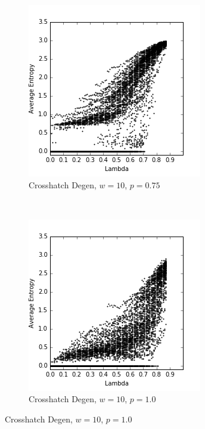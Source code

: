 \documentclass[a4paper,11pt]{report}
\begin{document}
\begin{figure}[htp]
\begin{subfigure}[t]{0.4\textwidth}
  \end{subfigure}

\begin{subfigure}[t]{0.4\textwidth}
  \centering
  \includegraphics[width=\textwidth]{ch6_figs/ch_w10_p75_entropy_scatter}
  \caption{Crosshatch Degen, $w=10$, $p=0.75$}
  \label{fig:lw_w10_p75}
  \end{subfigure}
~
\begin{subfigure}[t]{0.4\textwidth}
  \centering
  \includegraphics[width=\textwidth]{ch6_figs/ch_w10_p100_entropy_scatter}
  \caption{Crosshatch Degen, $w=10$, $p=1.0$}
  \label{fig:lw_w10_p100}
  \end{subfigure}


\end{figure}
\end{document}
